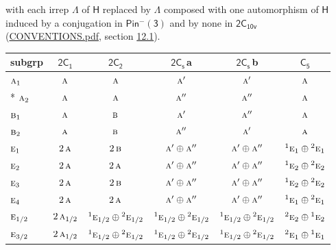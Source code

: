\documentclass[10pt,a4paper]{article}
\numberwithin{equation}{section}
\newcommand{\grp}[1]{\mathsf{#1}}
\newcommand{\irr}[1]{\text{\normalfont\scshape #1}}
\newcommand{\conjpair}[1]{{}^{#1}}
\newcommand{\clsletter}[1]{\,{\scriptsize\color{black!55}#1}}
\begin{document}
with each irrep $\Lambda$ of $\grp{H}$ replaced by $\Lambda$ composed with one automorphism of $\grp{H}$ induced by a conjugation in \href{Pinminus3.pdf}{$\grp{Pin^{-}(3)}$} and by none in $\grp{2C_{10v}}$ (\href{../../CONVENTIONS.pdf}{CONVENTIONS.pdf}, section \href{../../../rotation/CONVENTIONS.pdf\#conv.12.1}{12.1}).
{\small\begin{longtable}{@{}lccccc@{}}\toprule
subgrp & \href{2C1.pdf}{$\grp{2C_{1}}$} & \href{2C2.pdf}{$\grp{2C_{2}}$} & \href{2C1v.pdf}{$\grp{2C_{s}}$}\clsletter{a} & \href{2C1v.pdf}{$\grp{2C_{s}}$}\clsletter{b} & \href{C5.pdf}{$\grp{C_{5}}$}\\\midrule\endhead
\bottomrule\endfoot\endlastfoot
$\irr{a}_{1}$ & $\irr{a}$ & $\irr{a}$ & $\irr{a}'$ & $\irr{a}'$ & $\irr{a}$\\*
$\irr{a}_{2}$ & $\irr{a}$ & $\irr{a}$ & $\irr{a}''$ & $\irr{a}''$ & $\irr{a}$\\
$\irr{b}_{1}$ & $\irr{a}$ & $\irr{b}$ & $\irr{a}'$ & $\irr{a}''$ & $\irr{a}$\\
$\irr{b}_{2}$ & $\irr{a}$ & $\irr{b}$ & $\irr{a}''$ & $\irr{a}'$ & $\irr{a}$\\
$\irr{e}_{1}$ & $2\,\irr{a}$ & $2\,\irr{b}$ & $\irr{a}'\oplus \irr{a}''$ & $\irr{a}'\oplus \irr{a}''$ & $\conjpair{1}\irr{e}_{1}\oplus \conjpair{2}\irr{e}_{1}$\\
$\irr{e}_{2}$ & $2\,\irr{a}$ & $2\,\irr{a}$ & $\irr{a}'\oplus \irr{a}''$ & $\irr{a}'\oplus \irr{a}''$ & $\conjpair{1}\irr{e}_{2}\oplus \conjpair{2}\irr{e}_{2}$\\
$\irr{e}_{3}$ & $2\,\irr{a}$ & $2\,\irr{b}$ & $\irr{a}'\oplus \irr{a}''$ & $\irr{a}'\oplus \irr{a}''$ & $\conjpair{1}\irr{e}_{2}\oplus \conjpair{2}\irr{e}_{2}$\\
$\irr{e}_{4}$ & $2\,\irr{a}$ & $2\,\irr{a}$ & $\irr{a}'\oplus \irr{a}''$ & $\irr{a}'\oplus \irr{a}''$ & $\conjpair{1}\irr{e}_{1}\oplus \conjpair{2}\irr{e}_{1}$\\
$\irr{e}_{1/2}$ & $2\,\irr{a}_{1/2}$ & $\conjpair{1}\irr{e}_{1/2}\oplus \conjpair{2}\irr{e}_{1/2}$ & $\conjpair{1}\irr{e}_{1/2}\oplus \conjpair{2}\irr{e}_{1/2}$ & $\conjpair{1}\irr{e}_{1/2}\oplus \conjpair{2}\irr{e}_{1/2}$ & $\conjpair{2}\irr{e}_{2}\oplus \conjpair{1}\irr{e}_{2}$\\
$\irr{e}_{3/2}$ & $2\,\irr{a}_{1/2}$ & $\conjpair{1}\irr{e}_{1/2}\oplus \conjpair{2}\irr{e}_{1/2}$ & $\conjpair{1}\irr{e}_{1/2}\oplus \conjpair{2}\irr{e}_{1/2}$ & $\conjpair{1}\irr{e}_{1/2}\oplus \conjpair{2}\irr{e}_{1/2}$ & $\conjpair{2}\irr{e}_{1}\oplus \conjpair{1}\irr{e}_{1}$\\

\end{longtable}}
\end{document}
